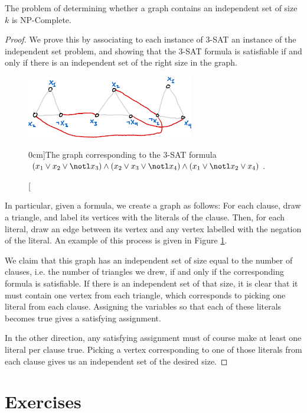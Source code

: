 \documentclass[nobib]{tufte-handout}
\begin{document}
\begin{theorem}
    The problem of determining whether a graph contains an independent set of size $k$ is NP-Complete.

    \begin{proof}
        We prove this by associating to each instance of 3-SAT an instance of the independent set problem, and showing that the 3-SAT formula is satisfiable if and only if there is an independent set of the right size in the graph.

        \begin{figure}
            \centering
            \includegraphics[width=0.65\textwidth]{graphics/L8_vx_covers_hamiltonicity_etc/3sat_triangles.png}
            \caption[][0cm]{The graph corresponding to the 3-SAT formula $\left(x_1 \vee x_2 \vee \notl x_3\right) \wedge \left(x_2 \vee x_3 \vee \notl x_4\right) \wedge \left(x_1 \vee \notl x_2 \vee x_4\right)$.}
            \label{fig:3sat_triangles}
        \end{figure}

        In particular, given a formula, we create a graph as follows: For each clause, draw a triangle, and label its vertices with the literals of the clause. Then, for each literal, draw an edge between its vertex and any vertex labelled with the negation of the literal. An example of this process is given in Figure \ref{fig:3sat_triangles}.

        We claim that this graph has an independent set of size equal to the number of clauses, i.e. the number of triangles we drew, if and only if the corresponding formula is satisfiable. If there is an independent set of that size, it is clear that it must contain one vertex from each triangle, which corresponds to picking one literal from each clause. Assigning the variables so that each of these literals becomes true gives a satisfying assignment.

        In the other direction, any satisfying assignment must of course make at least one literal per clause true. Picking a vertex corresponding to one of those literals from each clause gives us an independent set of the desired size.
    \end{proof}
\end{theorem}

\section{Exercises}


%
%
\end{document}
